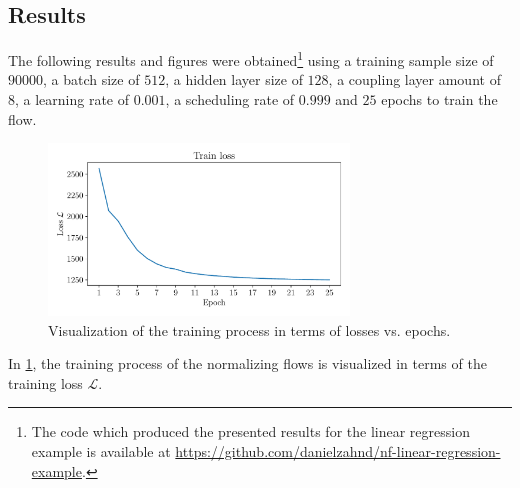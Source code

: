 \documentclass[a4paper,12pt]{report}
\begin{document}
\subsection{Results}
The following results and figures were obtained\footnote{The code which produced the presented results for the linear regression example is available at \url{https://github.com/danielzahnd/nf-linear-regression-example}.} using a training sample size of $90000$, a batch size of $512$, a hidden layer size of $128$, a coupling layer amount of $8$, a learning rate of $0.001$, a scheduling rate of $0.999$ and $25$ epochs to train the flow.
\begin{figure}[h!]
\centering
\includegraphics[width=8cm]{figures/nf-linear-regression-example-loss.pdf}
\caption{Visualization of the training process in terms of losses vs. epochs.}
\label{fig:nf-linear-regression-example-loss}
\end{figure}
In \cref{fig:nf-linear-regression-example-loss}, the training process of the normalizing flows is visualized in terms of the training loss $\mathcal{L}$.
\end{document}
